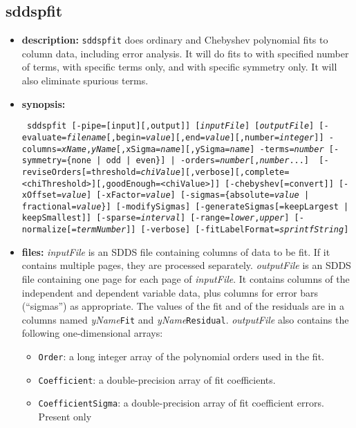 \newpage
\subsection{sddspfit}
\label{sddspfit}

\begin{itemize}
\item {\bf description:} 
{\tt sddspfit} does ordinary and Chebyshev polynomial fits to column data, including error analysis.
It will do fits to with specified number of terms, with specific terms only, and with specific symmetry
only.  It will also eliminate spurious terms.
\item {\bf synopsis:} 
\begin{flushleft}{\tt
sddspfit [-pipe=[input][,output]] [{\em inputFile}] [{\em outputFile}]
  [-evaluate={\em filename}[,begin={\em value}][,end={\em value}][,number={\em integer}]]
  -columns={\em xName},{\em yName}[,xSigma={\em name}][,ySigma={\em name}]
  {-terms={\em number} [-symmetry=\{none | odd | even\}] | -orders={\em number}[,{\em number}...] }
  [-reviseOrders[=threshold={\em chiValue}][,verbose][,complete=<chiThreshold>][,goodEnough=<chiValue>]]
  [-chebyshev[=convert]]
  [-xOffset={\em value}] [-xFactor={\em value}]
  [-sigmas=\{absolute={\em value} | fractional={\em value}\}] 
  [-modifySigmas] [-generateSigmas[={keepLargest | keepSmallest}]]
  [-sparse={\em interval}] [-range={\em lower},{\em upper}]
  [-normalize[={\em termNumber}]] [-verbose]
  [-fitLabelFormat={\em sprintfString}]
}\end{flushleft}
\item {\bf files:}
{\em inputFile} is an SDDS file containing columns of data to be fit.  If it contains multiple pages, they are processed
separately.  {\em outputFile} is an SDDS file containing one page for each page of {\em inputFile}.  It contains columns of
the independent and dependent variable data, plus columns for error bars (``sigmas'') as appropriate.  The values of the fit
and of the residuals are in a columns named {\em yName}{\tt Fit} and {\em yName}{\tt Residual}.  {\em outputFile} also contains the
following one-dimensional arrays:
\begin{itemize}
\item {\tt Order}: a long integer array of the polynomial orders used in the fit.
\item {\tt Coefficient}: a double-precision array of fit coefficients.
\item {\tt CoefficientSigma}: a double-precision array of fit coefficient errors.  Present only

\end{itemize}
\end{itemize}
